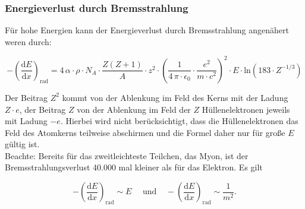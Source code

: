 % 


\subsubsection*{Energieverlust durch Bremsstrahlung}

Für hohe Energien kann der Energieverlust durch Bremsstrahlung angenähert weren durch:

\[-\left(\frac{\mathrm{d}E}{\mathrm{d}x}\right)_{\text{rad}} = 4\,\alpha\cdot \rho\cdot N_A \cdot
\frac{Z(Z+1)}{A} \cdot z^2\cdot \left(\frac{1}{4\,\pi\cdot \epsilon_0}\cdot \frac{e^2}{m\cdot c^2}
\right)^2 \cdot E\cdot \text{ln}(183\cdot Z^{-1/3}) \]

Der Beitrag $Z^2$ kommt von der Ablenkung im Feld des Kerns mit der Ladung $Z\cdot e$, der Beitrag
$Z$ von der Ablenkung im Feld der $Z$ Hüllenelektronen jeweils mit Ladung $-e$. Hierbei wird nicht
berücksichtigt, dass die Hüllenelektronen das Feld des Atomkerns teilweise abschirmen und die Formel
daher nur für große $E$ gültig ist.
\\
Beachte: Bereits für das zweitleichteste Teilchen, das Myon, ist der Bremsstrahlungsverlust 40.000
mal kleiner als für das Elektron. Es gilt

\[-\left(\frac{\mathrm{d}E}{\mathrm{d}x}\right)_{\text{rad}} \sim E~~~~~~\text{und}~~~~~
-\left(\frac{\mathrm{d}E}{\mathrm{d}x}\right)_{\text{rad}} \sim \frac{1}{m^2}.\]

